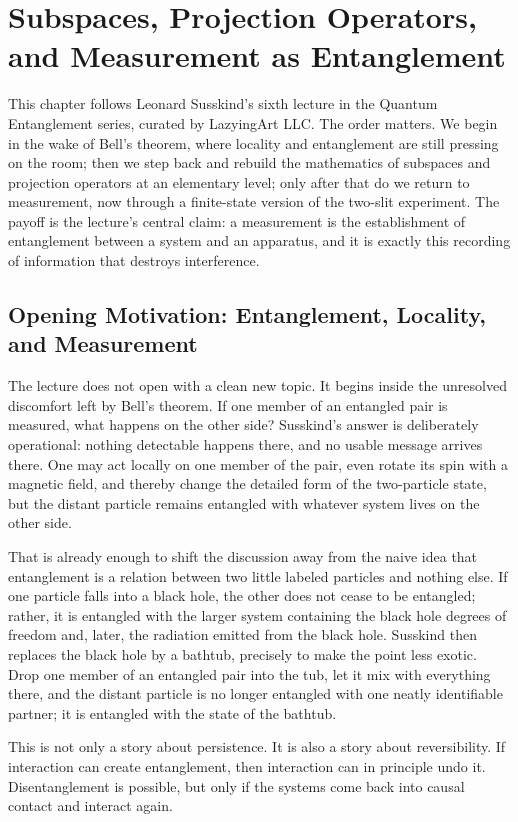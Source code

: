 \chapter{Subspaces, Projection Operators, and Measurement as Entanglement}

This chapter follows Leonard Susskind's sixth lecture in the Quantum Entanglement series, curated by LazyingArt LLC. The order matters. We begin in the wake of Bell's theorem, where locality and entanglement are still pressing on the room; then we step back and rebuild the mathematics of subspaces and projection operators at an elementary level; only after that do we return to measurement, now through a finite-state version of the two-slit experiment. The payoff is the lecture's central claim: a measurement is the establishment of entanglement between a system and an apparatus, and it is exactly this recording of information that destroys interference.

\section{Opening Motivation: Entanglement, Locality, and Measurement}

The lecture does not open with a clean new topic. It begins inside the unresolved discomfort left by Bell's theorem. If one member of an entangled pair is measured, what happens on the other side? Susskind's answer is deliberately operational: nothing detectable happens there, and no usable message arrives there. One may act locally on one member of the pair, even rotate its spin with a magnetic field, and thereby change the detailed form of the two-particle state, but the distant particle remains entangled with whatever system lives on the other side.

That is already enough to shift the discussion away from the naive idea that entanglement is a relation between two little labeled particles and nothing else. If one particle falls into a black hole, the other does not cease to be entangled; rather, it is entangled with the larger system containing the black hole degrees of freedom and, later, the radiation emitted from the black hole. Susskind then replaces the black hole by a bathtub, precisely to make the point less exotic. Drop one member of an entangled pair into the tub, let it mix with everything there, and the distant particle is no longer entangled with one neatly identifiable partner; it is entangled with the state of the bathtub.

This is not only a story about persistence. It is also a story about reversibility. If interaction can create entanglement, then interaction can in principle undo it. Disentanglement is possible, but only if the systems come back into causal contact and interact again.

